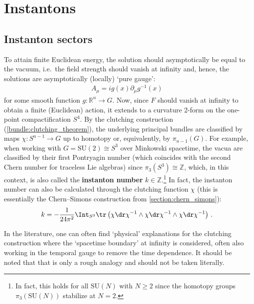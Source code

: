 
\section{Instantons}
\subsection{Instanton sectors}


    To attain finite Euclidean energy, the solution should asymptotically be equal to the vacuum, i.e.~the field strength should vanish at infinity and, hence, the solutions are asymptotically (locally) `pure gauge':
    \begin{gather}
        A_\mu = ig(x)\partial_\mu g^{-1}(x)
    \end{gather}
    for some smooth function $g:\mathbb{R}^n\rightarrow G$. Now, since $F$ should vanish at infinity to obtain a finite (Euclidean) action, it extends to a curvature 2-form on the one-point compactification $S^4$. By the clutching construction (\cref{bundle:clutching_theorem}), the underlying principal bundles are classified by maps $\chi:S^{n-1}\rightarrow G$ up to homotopy or, equivalently, by $\pi_{n-1}(G)$. For example, when working with $G=\mathrm{SU}(2)\cong S^3$ over Minkowski spacetime, the vacua are classified by their first Pontryagin number (which coincides with the second Chern number for traceless Lie algebras) since $\pi_3(S^3)\cong\mathbb{Z}$, which, in this context, is also called the \textbf{instanton number} $k\in\mathbb{Z}$.\footnote{In fact, this holds for all $\mathrm{SU}(N)$ with $N\geq2$ since the homotopy groups $\pi_3(\mathrm{SU}(N))$ stabilize at $N=2$.} In fact, the instanton number can also be calculated through the clutching function $\chi$ (this is essentially the Chern--Simons construction from \cref{section:chern_simons}):
    \begin{gather}
        \label{gauge:winding_number}
        k = -\frac{1}{24\pi^2}\Int_{S^3}\tr\left(\chi\dr\chi^{-1}\wedge\chi\dr\chi^{-1}\wedge\chi\dr\chi^{-1}\right)\,.
    \end{gather}

    \begin{remark}[Literature]
        In the literature, one can often find `physical' explanations for the clutching construction where the `spacetime boundary' at infinity is considered, often also working in the temporal gauge to remove the time dependence. It should be noted that that is only a rough analogy and should not be taken literally. 
    \end{remark}

